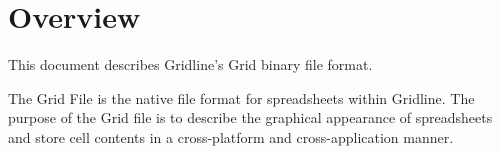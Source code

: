 \chapter{Overview}

This document describes Gridline's Grid binary file format.

The Grid File is the native file format for spreadsheets within Gridline. The 
purpose of the Grid file is to describe the graphical appearance of 
spreadsheets and store cell contents in a cross-platform and cross-application
manner.
